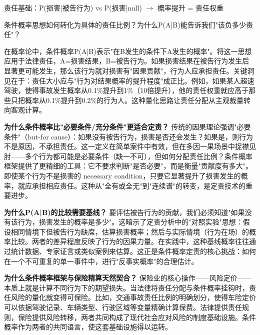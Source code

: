 \documentclass[../main.tex]{subfiles}
\begin{document}
	\begin{logicmap}

		责任基础：P(损害|被告行为) vs P(损害|null) $\rightarrow$ 概率提升 = 责任权重

	\end{logicmap}
	
	\begin{questionbox}

		条件概率思想如何转化为具体的责任比例？为什么P(A|B)能告诉我们"该负多少责任"？

	\end{questionbox}
	
	在概率论中，条件概率P(A|B)表示"在B发生的条件下A发生的概率"。将这一思想应用于法律责任，A=损害结果，B=被告行为。如果损害结果在被告行为发生后显著更可能发生，那么该行为就对损害有"因果贡献"，行为人应承担责任。关键洞见在于：责任大小应与"行为对结果概率的提升程度"成正比。例如，如果某人超速驾驶，使得事故发生概率从0.1\%提升到1\%（10倍提升），他的责任权重就应高于那些只把概率从0.1\%提升到0.2\%的行为人。这种量化思路让责任分配从主观裁量转向客观计算。
	
	\textbf{为什么条件概率比"必要条件/充分条件"更适合定责？} 传统的因果理论强调"必要条件"（but-for cause）：如果没有被告行为，损害是否还会发生？如果是，则行为不是原因，不承担责任。这一定义在简单案件中有效，但在多因一果场景中捉襟见肘——多个行为都可能是必要条件（缺一不可），但如何分配责任比例？条件概率框架提供了更精细的工具：它不要求判断"是否必要"，而是衡量"贡献度有多大"。即使某个行为不是损害的 necessary condition，只要它显著提升了损害发生的概率，就应承担相应责任。这种从"全有或全无"到"连续谱"的转变，是定责技术的重要进步。
	
	\textbf{为什么P(A|B)的比较需要基线？} 要评估被告行为的贡献，我们必须知道"如果没有该行为，损害发生的概率是多少"。这暗示了定责分析中的"对照实验"思想：假设相同情境下但被告行为缺席，估算损害概率；然后与实际情境（行为在场）的概率比较。两者的差异程度反映了行为的因果力量。在实践中，这种基线概率往往通过统计数据、专家证言或类似案例来估算。这正是条件概率定责的核心挑战：如何在一个不可重复的单一事件中，进行"反事实概率"的合理估计。
	
	\textbf{为什么条件概率框架与保险精算天然契合？} 保险业的核心操作——风险定价——本质上就是计算不同行为下的期望损失。当法律将责任分配与条件概率挂钩时，责任风险的量化就变得可保险。比如，交通事故责任比例的明确划分，使得车险定价可以依据驾驶记录、车辆类型、行驶区域等变量精确计算保费。法律提供责任规则，保险提供风险转移，两者共同构成了现代社会应对风险的制度基础设施。条件概率作为两者的共同语言，使这套基础设施得以运转。
	
\end{document}
